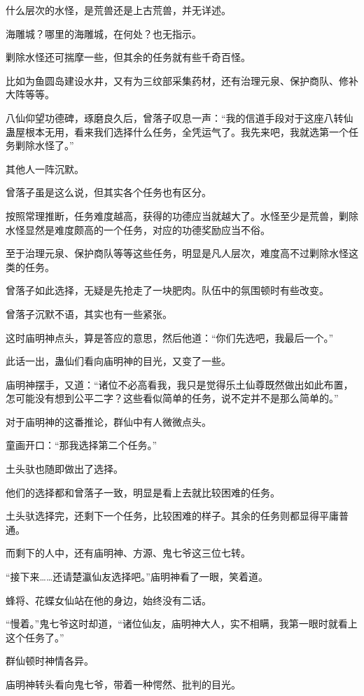 \begin{this_body}
什么层次的水怪，是荒兽还是上古荒兽，并无详述。

海雕城？哪里的海雕城，在何处？也无指示。

剿除水怪还可揣摩一些，但其余的任务就有些千奇百怪。

比如为鱼圆岛建设水井，又有为三纹部采集药材，还有治理元泉、保护商队、修补大阵等等。

八仙仰望功德碑，琢磨良久后，曾落子叹息一声：“我的信道手段对于这座八转仙蛊屋根本无用，看来我们选择什么任务，全凭运气了。我先来吧，我就选第一个任务剿除水怪了。”

其他人一阵沉默。

曾落子虽是这么说，但其实各个任务也有区分。

按照常理推断，任务难度越高，获得的功德应当就越大了。水怪至少是荒兽，剿除水怪显然是难度颇高的一个任务，对应的功德奖励应当不俗。

至于治理元泉、保护商队等等这些任务，明显是凡人层次，难度高不过剿除水怪这类的任务。

曾落子如此选择，无疑是先抢走了一块肥肉。队伍中的氛围顿时有些改变。

曾落子沉默不语，其实也有一些紧张。

这时庙明神点头，算是答应的意思，然后他道：“你们先选吧，我最后一个。”

此话一出，蛊仙们看向庙明神的目光，又变了一些。

庙明神摆手，又道：“诸位不必高看我，我只是觉得乐土仙尊既然做出如此布置，怎可能没有想到公平二字？这些看似简单的任务，说不定并不是那么简单的。”

对于庙明神的这番推论，群仙中有人微微点头。

童画开口：“那我选择第二个任务。”

土头驮也随即做出了选择。

他们的选择都和曾落子一致，明显是看上去就比较困难的任务。

土头驮选择完，还剩下一个任务，比较困难的样子。其余的任务则都显得平庸普通。

而剩下的人中，还有庙明神、方源、鬼七爷这三位七转。

“接下来……还请楚瀛仙友选择吧。”庙明神看了一眼，笑着道。

蜂将、花蝶女仙站在他的身边，始终没有二话。

“慢着。”鬼七爷这时却道，“诸位仙友，庙明神大人，实不相瞒，我第一眼时就看上这个任务了。”

群仙顿时神情各异。

庙明神转头看向鬼七爷，带着一种愕然、批判的目光。


\end{this_body}
